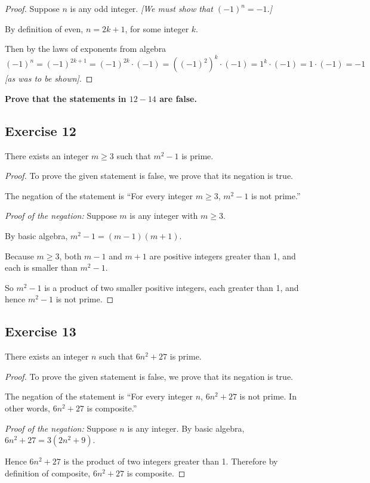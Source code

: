 \documentclass[14pt]{extarticle}
\newcommand{\cy}{\color{cyan}}
\begin{document}
\begin{proof}
    Suppose $n$ is any odd integer. {\it [We must show that $(-1)^n = -1$.]}

    By definition of even, $n = 2k+1$, for some integer $k$.

    Then by the laws of exponents from algebra
    \[
        (-1)^n = (-1)^{2k+1} = (-1)^{2k}\cdot(-1) = ((-1)^2)^k\cdot(-1) = 1^k\cdot(-1) = 1\cdot(-1) = -1
    \]
    {\it [as was to be shown]}.
\end{proof}

{\bf \cy Prove that the statements in $12-14$ are false.}

\subsection{Exercise 12}
There exists an integer $m \geq 3$ such that $m^2 - 1$ is prime.

\begin{proof}
    To prove the given statement is false, we prove that its
    negation is true.

    The negation of the statement is “For every integer $m \geq 3$, $m^2 - 1$ is not prime.”

    {\it Proof of the negation:} Suppose $m$ is any integer with $m \geq 3$.

    By basic algebra, $m^2 - 1 = (m - 1)(m + 1)$.

    Because $m \geq 3$, both $m - 1$ and $m + 1$ are positive integers greater than 1, and each is smaller than $m^2 - 1$.

    So $m^2 - 1$ is a product of two smaller positive integers, each greater than 1, and hence $m^2 - 1$ is not prime.
\end{proof}

\subsection{Exercise 13}
There exists an integer $n$ such that $6n^2 + 27$ is prime.

\begin{proof}
    To prove the given statement is false, we prove that its
    negation is true.

    The negation of the statement is “For every integer $n$, $6n^2+27$ is not prime. In other words, $6n^2+27$ is composite.”

    {\it Proof of the negation:} Suppose $n$ is any integer.
    By basic algebra, $6n^2 + 27 = 3(2n^2 + 9)$.

    Hence $6n^2+27$ is the product of two integers greater than 1. Therefore by definition of composite, $6n^2+27$ is composite.
\end{proof}
\end{document}
